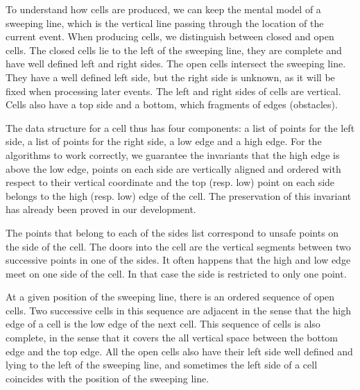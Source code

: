 \documentclass{llncs}
\begin{document}
To understand how cells are produced, we can keep the mental model of a
sweeping line, which is the vertical line passing through the location 
of the current event.
When producing cells, we distinguish between closed and open cells.
The closed cells lie to the left of the sweeping line, they are
complete and have well defined left and right sides.  The open cells
intersect the sweeping line.  They have a well defined left side,
but the right side is unknown, as it will be fixed when
processing later events.
The left and right sides of cells are vertical.  Cells also have a top
side and a bottom, which fragments of edges (obstacles).

The data structure for a cell thus has four components: a list of
points for the left side, a list of points for the right side, a low
edge and a high edge.  For the algorithms to work correctly, we guarantee
the invariants that the high edge is above the low edge, points on
each side are vertically aligned and ordered with respect to their
vertical coordinate and the top (resp. low) point on each side belongs
to the high (resp. low) edge of the cell.  The preservation of this
invariant has already been proved in our development.

The points that belong to each of the sides list correspond to unsafe
points on the side of the cell.  The doors into the cell are the
vertical segments between two successive points in one of the sides.
It often happens that the high and low edge meet on one side of the
cell.  In that case the side is restricted to only one point.


At a given position of the sweeping line, there is an ordered sequence
of open cells.  Two successive cells in this sequence are adjacent in
the sense that the high edge of a cell is the low edge of the next
cell.  This sequence of cells is also complete, in the sense that it
covers the all vertical space between the bottom edge and the top
edge.  All the open cells also have their left side well defined and
lying to the left of the sweeping line, and sometimes the left side of
a cell coincides with the position of the sweeping line.
\end{document}
